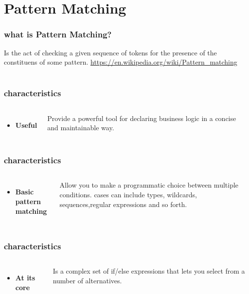 \documentclass{beamer}
\begin{document}
\section{Pattern Matching} %
\begin{frame}
\frametitle{what is Pattern Matching?}
Is the act of checking a given sequence of tokens for the presence of the constituens of some pattern.
{\color{blue}\url{https://en.wikipedia.org/wiki/Pattern_matching}}
\\~\\
\end{frame}
\begin{frame}
\frametitle{characteristics}
\begin{columns}[c]
\begin{itemize}
\item \textbf{Useful}
\end{itemize}
Provide a powerful tool for declaring business logic in a concise and maintainable way.
\end{columns}
\end{frame}
\begin{frame}
\frametitle{characteristics}
\begin{columns}[c]
\begin{itemize}
\item \textbf{Basic pattern matching}
\end{itemize}
Allow you to make a programmatic choice between multiple conditions. cases can include types, wildcards, sequences,regular expressions and so forth.
\end{columns}
\end{frame}
\begin{frame}
\frametitle{characteristics}
\begin{columns}[c]
\begin{itemize}
\item \textbf{At its core}
\end{itemize}
Is a complex set of if/else expressions that lets you select from a number of alternatives.
\end{columns}
\end{frame}
\end{document}
